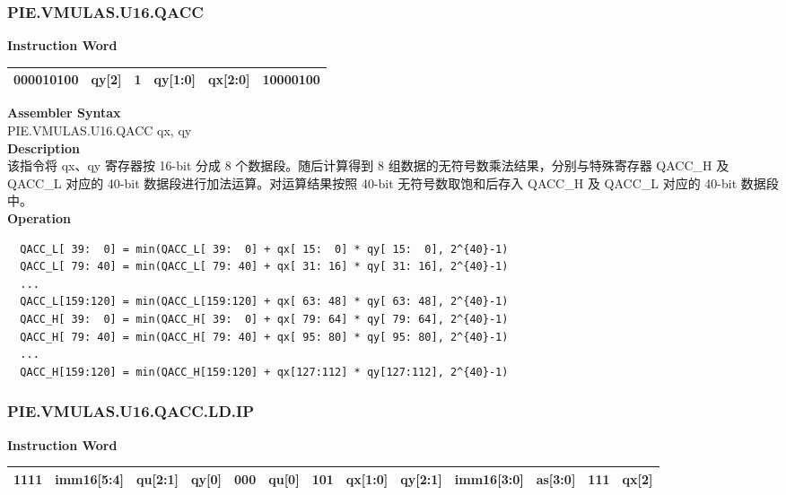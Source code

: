 \newpage
\subsubsection{PIE.VMULAS.U16.QACC}\label{instruction:PIEVMULASU16QACC}
\setlength\tabcolsep{6pt}
\textbf{Instruction Word} \\
\begin{tabular}{|c|c|c|c|c|c|}
	\hline
	000010100 & qy[2] & 1 & qy[1:0] & qx[2:0] & 10000100 \\
	\hline
\end{tabular}

\textbf{Assembler Syntax} \\
PIE.VMULAS.U16.QACC qx, qy \\
\textbf{Description} \\
该指令将 qx、qy 寄存器按 16-bit 分成 8 个数据段。随后计算得到 8 组数据的无符号数乘法结果，分别与特殊寄存器 QACC\_H 及 QACC\_L 对应的 40-bit 数据段进行加法运算。对运算结果按照 40-bit 无符号数取饱和后存入 QACC\_H 及 QACC\_L 对应的 40-bit 数据段中。\\
\textbf{Operation}
\begin{lstlisting}
  QACC_L[ 39:  0] = min(QACC_L[ 39:  0] + qx[ 15:  0] * qy[ 15:  0], 2^{40}-1)
  QACC_L[ 79: 40] = min(QACC_L[ 79: 40] + qx[ 31: 16] * qy[ 31: 16], 2^{40}-1)
  ...
  QACC_L[159:120] = min(QACC_L[159:120] + qx[ 63: 48] * qy[ 63: 48], 2^{40}-1)
  QACC_H[ 39:  0] = min(QACC_H[ 39:  0] + qx[ 79: 64] * qy[ 79: 64], 2^{40}-1)
  QACC_H[ 79: 40] = min(QACC_H[ 79: 40] + qx[ 95: 80] * qy[ 95: 80], 2^{40}-1)
  ...
  QACC_H[159:120] = min(QACC_H[159:120] + qx[127:112] * qy[127:112], 2^{40}-1)
\end{lstlisting}

\newpage
\subsubsection{PIE.VMULAS.U16.QACC.LD.IP}\label{instruction:PIEVMULASU16QACCLDIP}
\setlength\tabcolsep{6pt}
\textbf{Instruction Word} \\
\begin{tabular}{|c|c|c|c|c|c|c|c|c|c|c|c|c|}
	\hline
	1111 & imm16[5:4] & qu[2:1] & qy[0] & 000 & qu[0] & 101 & qx[1:0] & qy[2:1] & imm16[3:0] & as[3:0] & 111 & qx[2] \\
	\hline
\end{tabular}

